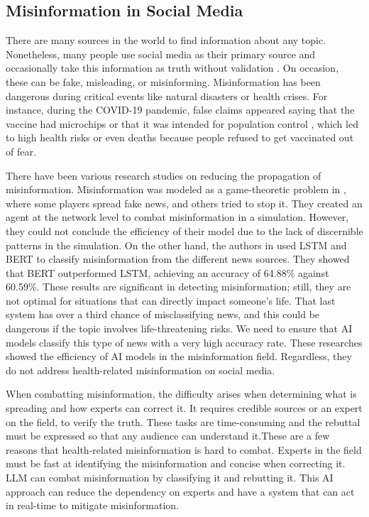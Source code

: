 \subsection{Misinformation in Social Media}
There are many sources in the world to find information about any topic. Nonetheless, many people use social media as their primary source \cite{socialmedias} and occasionally take this information as truth without
validation \cite{social_fact}. On occasion, these can be fake, misleading, or misinforming. 
Misinformation has been dangerous during critical events like natural disasters or health crises. For instance, during the COVID-19 pandemic, false claims appeared saying that the vaccine had
microchips or that it was intended for population control \cite{10.1371/journal.pone.0251605}, which led to high health risks or even deaths \cite{article} because people refused to get vaccinated out of fear. 

There have been various research studies on reducing the propagation of misinformation. Misinformation was modeled as a game-theoretic problem in \cite{9906925}, where some players spread fake news, and others tried
to stop it. They created an agent at the network level to combat misinformation in a simulation. However, they could not conclude the efficiency of their model due to the lack of discernible patterns in the simulation. On
the other hand, the authors in \cite{10100054} used LSTM and BERT to classify misinformation from the different news sources. They showed that BERT outperformed LSTM, achieving an accuracy of 64.88\% against 60.59\%. 
These results are significant in detecting misinformation; still, they are not optimal for situations that can directly impact someone's life. That last system has over a third chance of misclassifying news, and this could
be dangerous if the topic involves life-threatening risks. We need to ensure that AI models classify this type of news with a very high accuracy rate. These researches showed the efficiency of AI models in the misinformation field.
Regardless, they do not address health-related misinformation on social media. 

When combatting misinformation, the difficulty arises when determining what is spreading and how experts can correct it. It requires credible sources or an expert on the field, to verify the truth.
These tasks are time-consuming and the rebuttal must be expressed so that any audience can understand it.These are a few reasons that health-related misinformation is hard to combat.
Experts in the field must be fast at identifying the misinformation and concise when correcting it. 
LLM can combat misinformation by classifying it and rebutting it. This AI approach can reduce the dependency on experts and have a system that can act in real-time to mitigate misinformation.


